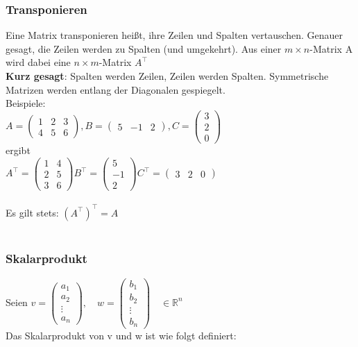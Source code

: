 \documentclass[6pt,a4paper]{scrartcl}
\newcommand{\R}{\mathbb{R}}
\begin{document}
\begin{multicols*}{3}
\subsubsection{Transponieren}
Eine Matrix transponieren heißt, ihre Zeilen und Spalten vertauschen. Genauer gesagt, die Zeilen werden zu Spalten (und umgekehrt). Aus einer $m{\times}n$-Matrix A wird dabei eine $n{\times}m$-Matrix $A^\top$\\
\textbf{Kurz gesagt}: Spalten werden Zeilen, Zeilen werden Spalten. Symmetrische Matrizen werden entlang der Diagonalen gespiegelt.\\
Beispiele:\\
$A=\begin{pmatrix}1&2&3\\4&5&6\end{pmatrix}, B=\begin{pmatrix}5&-1&2\end{pmatrix}, C=\begin{pmatrix}3\\2\\0\end{pmatrix}$ \\
ergibt	 \\
$A^\top=\begin{pmatrix}1&4\\2&5\\3&6\end{pmatrix}	B^\top=\begin{pmatrix}5\\-1\\2\end{pmatrix}	C^\top=\begin{pmatrix}3&2&0\end{pmatrix}$ \\
\\
Es gilt stets: $(A^\top)^\top = A$ \\
\\
\subsubsection{Skalarprodukt}
Seien 
$v = \begin{pmatrix}a_1\\a_2\\\vdots\\a_n\end{pmatrix}, \quad w = \begin{pmatrix}b_1\\b_2\\\vdots\\b_n\end{pmatrix} \quad \in \R^n$ \\
Das Skalarprodukt von v und w ist wie folgt definiert:


\end{multicols*}
\end{document}
